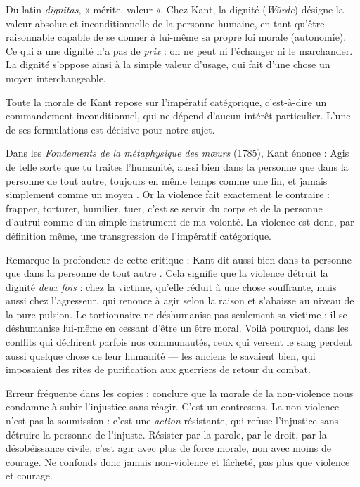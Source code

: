 \documentclass[11pt]{article}
\newcommand{\cle}[1]{{\popxbold\color{popdark}#1}}
\begin{document}
\begin{definition}[Dignité]
Du latin \emph{dignitas}, « mérite, valeur ». Chez Kant, la dignité (\emph{Würde}) désigne la valeur absolue et inconditionnelle de la personne humaine, en tant qu'être raisonnable capable de se donner à lui-même sa propre loi morale (autonomie). Ce qui a une dignité n'a pas de \emph{prix} : on ne peut ni l'échanger ni le marchander. La dignité s'oppose ainsi à la simple valeur d'usage, qui fait d'une chose un moyen interchangeable.
\end{definition}

Toute la morale de Kant repose sur l'\cle{impératif catégorique}, c'est-à-dire un commandement inconditionnel, qui ne dépend d'aucun intérêt particulier. L'une de ses formulations est décisive pour notre sujet.

\begin{propriete}
Dans les \emph{Fondements de la métaphysique des mœurs} (1785), Kant énonce : \guillemotleft Agis de telle sorte que tu traites l'humanité, aussi bien dans ta personne que dans la personne de tout autre, toujours en même temps comme une fin, et jamais simplement comme un moyen \guillemotright. Or la violence fait exactement le contraire : frapper, torturer, humilier, tuer, c'est se servir du corps et de la personne d'autrui comme d'un simple instrument de ma volonté. La violence est donc, par définition même, une transgression de l'impératif catégorique.
\end{propriete}

Remarque la profondeur de cette critique : Kant dit \guillemotleft aussi bien dans ta personne que dans la personne de tout autre \guillemotright. Cela signifie que la violence détruit la dignité \emph{deux fois} : chez la victime, qu'elle réduit à une chose souffrante, mais aussi chez l'agresseur, qui renonce à agir selon la raison et s'abaisse au niveau de la pure pulsion. Le tortionnaire ne déshumanise pas seulement sa victime : il se déshumanise lui-même en cessant d'être un être moral. Voilà pourquoi, dans les conflits qui déchirent parfois nos communautés, ceux qui versent le sang perdent aussi quelque chose de leur humanité — les anciens le savaient bien, qui imposaient des rites de purification aux guerriers de retour du combat.

\begin{attention}
Erreur fréquente dans les copies : conclure que la morale de la non-violence nous condamne à subir l'injustice sans réagir. C'est un contresens. La \cle{non-violence} n'est pas la soumission : c'est une \emph{action} résistante, qui refuse l'injustice sans détruire la personne de l'injuste. Résister par la parole, par le droit, par la désobéissance civile, c'est agir avec plus de force morale, non avec moins de courage. Ne confonds donc jamais non-violence et lâcheté, pas plus que violence et courage.
\end{attention}
\end{document}
